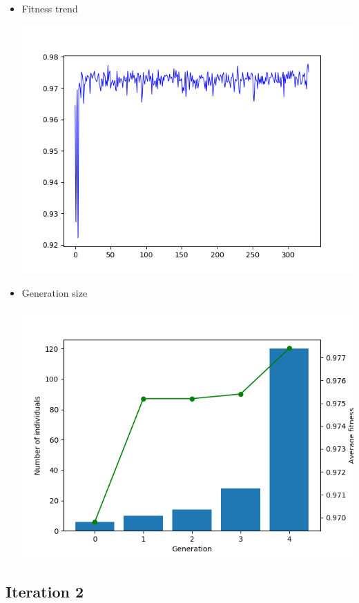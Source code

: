\documentclass[11pt]{article}
\makeatletter
\def\maxwidth{\ifdim\Gin@nat@width>\linewidth\linewidth
    \else\Gin@nat@width\fi}
\let\Oldincludegraphics\includegraphics
\renewcommand{\includegraphics}[1]{\Oldincludegraphics[width=.8\maxwidth]{#1}}
\providecommand{\tightlist}{%
      \setlength{\itemsep}{0pt}\setlength{\parskip}{0pt}}
\makeatother
\begin{document}
\begin{itemize}
\tightlist
\item
  Fitness trend

  \includegraphics{gfx/fitness-trend-tne-1.png}
\item
  Generation size

  \includegraphics{gfx/generation-size-tne-1.png}
\end{itemize}

    \hypertarget{iteration-2}{%
\subsection{Iteration 2}\label{iteration-2}}
\end{document}
